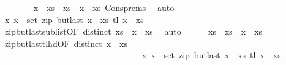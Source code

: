 \begin{isabellebody}
\ \ \ \ \ \ \isamarkupfalse%
\ {\isacartoucheopen}x\ {\isacharhash}{\kern0pt}\ xs\ {\isacharequal}{\kern0pt}\ xs\ {\isacharat}{\kern0pt}\ x\ {\isacharhash}{\kern0pt}\ xs\ Cons{\isachardot}{\kern0pt}prems\ \isamarkupfalse%
\ auto\isanewline
\ \ \ \ \isamarkupfalse%
\ \isamarkupfalse%
\ {\isachardoublequoteopen}{\isacharparenleft}{\kern0pt}x\ x\ {\isasymin}\ set\ {\isacharparenleft}{\kern0pt}zip\ {\isacharparenleft}{\kern0pt}butlast\ {\isacharparenleft}{\kern0pt}x\ {\isacharhash}{\kern0pt}\ xs\ {\isacharparenleft}{\kern0pt}tl\ {\isacharparenleft}{\kern0pt}x\ {\isacharhash}{\kern0pt}\ xs\isanewline
\ \ \ \ \ \ \isamarkupfalse%
\ zip{\isacharunderscore}{\kern0pt}butlast{\isacharunderscore}{\kern0pt}sublist{\isacharbrackleft}{\kern0pt}OF\ {\isacartoucheopen}distinct\ {\isacharparenleft}{\kern0pt}xs\ {\isacharat}{\kern0pt}\ {\isacharparenleft}{\kern0pt}x\ {\isacharhash}{\kern0pt}\ xs\ \isamarkupfalse%
\ auto\isanewline
\ \ \ \ \isamarkupfalse%
\ xs\ \ {\isachardoublequoteopen}xs\ {\isacharequal}{\kern0pt}\ x\ {\isacharhash}{\kern0pt}\ xs\isanewline
\ \ \ \ \ \ \isamarkupfalse%
\ zip{\isacharunderscore}{\kern0pt}butlast{\isacharunderscore}{\kern0pt}tl{\isacharunderscore}{\kern0pt}hd{\isacharbrackleft}{\kern0pt}OF\ {\isacartoucheopen}distinct\ {\isacharparenleft}{\kern0pt}x\ {\isacharhash}{\kern0pt}\ xs\ \isanewline
\ \ \ \ \ \ \ \ \ \ \ \ \ \ \ \ \ \ \ \ \ \ \ \ \ \ \ \ \ \ \ \ \ {\isacartoucheopen}{\isacharparenleft}{\kern0pt}x\ x\ {\isasymin}\ set\ {\isacharparenleft}{\kern0pt}zip\ {\isacharparenleft}{\kern0pt}butlast\ {\isacharparenleft}{\kern0pt}x\ {\isacharhash}{\kern0pt}\ xs\ {\isacharparenleft}{\kern0pt}tl\ {\isacharparenleft}{\kern0pt}x\ {\isacharhash}{\kern0pt}\ xs\isanewline

\end{isabellebody}

